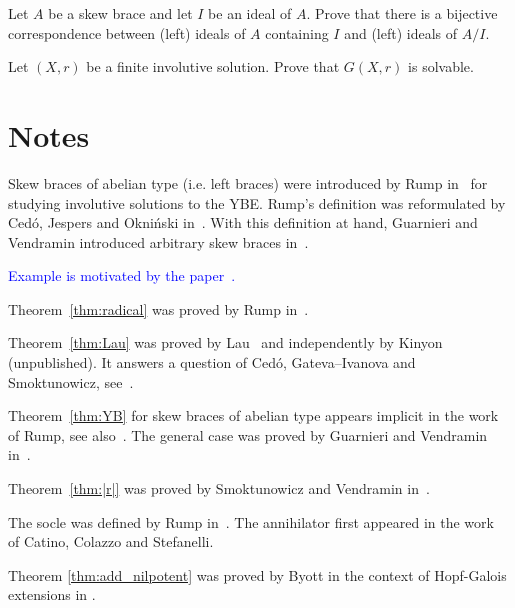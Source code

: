 \begin{prob}
\label{prob:correspondence}
Let $A$ be a skew brace and let $I$ be an ideal of $A$. Prove that there is a bijective correspondence between (left) ideals 
of $A$ containing $I$ and (left) ideals of $A/I$. 
\end{prob}

\begin{prob}
\label{prob:G(X,r)solvable}
Let $(X,r)$ be a finite involutive solution. Prove that $G(X,r)$ is solvable. 
\end{prob}


\section{Notes}

Skew braces of abelian type (i.e. left braces) were introduced by Rump in~\cite{MR2278047} for studying involutive
solutions to the YBE. 
Rump's definition was reformulated  
by Ced\'o, Jespers and Okni\'nski in~\cite{MR3177933}. With this definition at hand, 
Guarnieri and Vendramin introduced 
arbitrary skew braces in~\cite{MR3647970}. 

\textcolor{blue}{Example is motivated by the paper~\cite{MR1178147}.}

Theorem~\ref{thm:radical} was proved by Rump in~\cite{MR2278047}. 

Theorem~\ref{thm:Lau} was proved by Lau~\cite{MR4136750} and independently by Kinyon (unpublished). It answers 
a question of Ced\'o, Gateva--Ivanova and Smoktunowicz, see~\cite{MR3818285}. 

Theorem~\ref{thm:YB} for skew braces of abelian type appears implicit in the work~\cite{MR2278047} of Rump, see
also~\cite{MR3177933}. The general case was proved by Guarnieri and Vendramin in~\cite{MR3647970}. 

Theorem~\ref{thm:|r|} was proved by Smoktunowicz and Vendramin in~\cite{MR3763907}. 

The socle was defined by Rump in~\cite{MR2278047}. The annihilator first appeared in the work~\cite{MR3917122}  
of Catino, Colazzo and Stefanelli. 

Theorem \ref{thm:add_nilpotent} was proved by Byott in the context of Hopf-Galois extensions in \cite{MR3425626}. 


